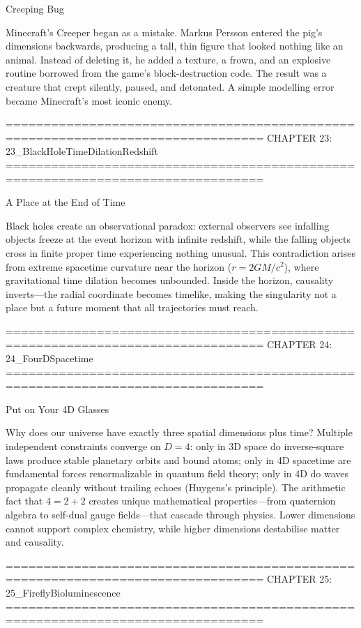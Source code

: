 Creeping Bug

Minecraft’s Creeper began as a mistake. Markus Persson entered the pig’s dimensions backwards, producing a tall, thin figure that looked nothing like an animal. Instead of deleting it, he added a texture, a frown, and an explosive routine borrowed from the game’s block-destruction code. The result was a creature that crept silently, paused, and detonated. A simple modelling error became Minecraft’s most iconic enemy.


================================================================================
CHAPTER 23: 23_BlackHoleTimeDilationRedshift
================================================================================

A Place at the End of Time

Black holes create an observational paradox: external observers see infalling objects freeze at the event horizon with infinite redshift, while the falling objects cross in finite proper time experiencing nothing unusual. This contradiction arises from extreme spacetime curvature near the horizon ($r = 2GM/c^2$), where gravitational time dilation becomes unbounded. Inside the horizon, causality inverts—the radial coordinate becomes timelike, making the singularity not a place but a future moment that all trajectories must reach.


================================================================================
CHAPTER 24: 24_FourDSpacetime
================================================================================

Put on Your 4D Glasses

Why does our universe have exactly three spatial dimensions plus time? Multiple independent constraints converge on $D=4$: only in 3D space do inverse-square laws produce stable planetary orbits and bound atoms; only in 4D spacetime are fundamental forces renormalizable in quantum field theory; only in 4D do waves propagate cleanly without trailing echoes (Huygens's principle). The arithmetic fact that $4 = 2+2$ creates unique mathematical properties—from quaternion algebra to self-dual gauge fields—that cascade through physics. Lower dimensions cannot support complex chemistry, while higher dimensions destabilise matter and causality.


================================================================================
CHAPTER 25: 25_FireflyBioluminescence
================================================================================

